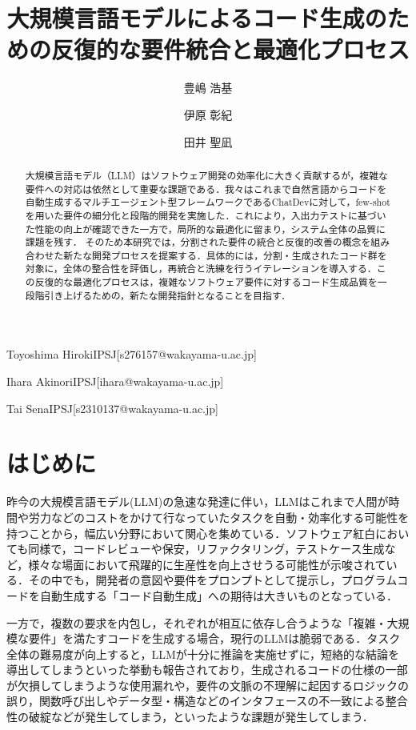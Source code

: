 \documentclass[submit,techrep,noauthor]{ipsj}
\begin{document}
\title{大規模言語モデルによるコード生成のための反復的な要件統合と最適化プロセス\\}




\author{豊嶋 浩基}{Toyoshima Hiroki}{IPSJ}[s276157@wakayama-u.ac.jp]
\author{伊原 彰紀}{Ihara Akinori}{IPSJ}[ihara@wakayama-u.ac.jp]
\author{田井 聖凪}{Tai Sena}{IPSJ}[s2310137@wakayama-u.ac.jp]

\begin{abstract}
大規模言語モデル（LLM）はソフトウェア開発の効率化に大きく貢献するが，複雑な要件への対応は依然として重要な課題である．我々はこれまで自然言語からコードを自動生成するマルチエージェント型フレームワークであるChatDevに対して，few-shotを用いた要件の細分化と段階的開発を実施した．これにより，入出力テストに基づいた性能の向上が確認できた一方で，局所的な最適化に留まり，システム全体の品質に課題を残す．
そのため本研究では，分割された要件の統合と反復的改善の概念を組み合わせた新たな開発プロセスを提案する．具体的には，分割・生成されたコード群を対象に，全体の整合性を評価し，再統合と洗練を行うイテレーションを導入する．この反復的な最適化プロセスは，複雑なソフトウェア要件に対するコード生成品質を一段階引き上げるための，新たな開発指針となることを目指す．

\end{abstract}


\maketitle

\section{はじめに}
昨今の大規模言語モデル(LLM)の急速な発達に伴い，LLMはこれまで人間が時間や労力などのコストをかけて行なっていたタスクを自動・効率化する可能性を持つことから，幅広い分野において関心を集めている．ソフトウェア紅白においても同様で，コードレビューや保安，リファクタリング，テストケース生成など，様々な場面において飛躍的に生産性を向上させうる可能性が示唆されている．その中でも，開発者の意図や要件をプロンプトとして提示し，プログラムコードを自動生成する「コード自動生成」への期待は大きいものとなっている．

一方で，複数の要求を内包し，それぞれが相互に依存し合うような「複雑・大規模な要件」を満たすコードを生成する場合，現行のLLMは脆弱である．タスク全体の難易度が向上すると，LLMが十分に推論を実施せずに，短絡的な結論を導出してしまうといった挙動も報告されており，生成されるコードの仕様の一部が欠損してしまうような使用漏れや，要件の文脈の不理解に起因するロジックの誤り，関数呼び出しやデータ型・構造などのインタフェースの不一致による整合性の破綻などが発生してしまう，といったような課題が発生してしまう．
\end{document}
